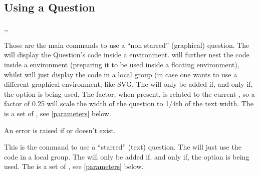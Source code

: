 \documentclass[10pt]{article}
\begin{document}
\subsection{Using a Question}\label{question use}
\begin{codedescribe}{\ftikzQuestion,\tikzQuestion,\rawtikzQuestion}
\begin{codesyntax}%
\tsobj{\ftikzQuestion}
\tsobj{\tikzQuestion}
\tsobj{\rawtikzQuestion}
\end{codesyntax}
Those are the main commands to use a ``non starred'' (graphical) question.
The \tsobj{\tikzQuestion} will display the Question's code inside a  environment. \tsobj{\ftikzQuestion} will further nest the code inside a  environment (preparing it to be used inside a floating environment), whilst \tsobj{\rawtikzQuestion} will just display the code in a local group (in case one wants to use a different graphical environment, like SVG. The  will only be added if, and only if, the  option is being used. The  factor, when present, is related to the current \tsobj{\textwidth}, so a factor of 0.25 will scale the width of the question to 1/4th of the text width. The  is a set of , see \ref{parameters} below.
\end{codedescribe}

\begin{tsremark}
An error is raised if  or  doesn't exist.
\end{tsremark}

\begin{codedescribe}{\textQuestion}
\begin{codesyntax}%
\tsobj{\textQuestion}
\end{codesyntax}
This is the command to use a ``starred'' (text) question.
The \tsobj{\textQuestion} will just use the code in a local group. The  will only be added if, and only if, the  option is being used. The  is a set of , see \ref{parameters} below.
\end{codedescribe}
\end{document}
